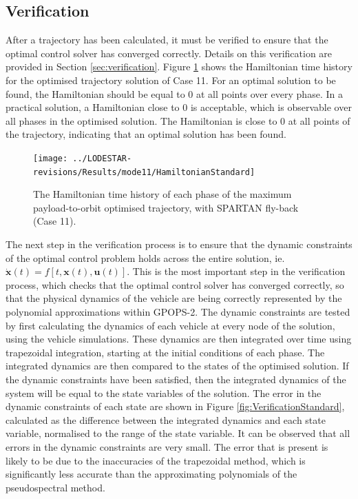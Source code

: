 \subsection{Verification}

After a trajectory has been calculated, it must be verified to ensure that the optimal control solver has converged correctly. Details on this verification are provided in Section \ref{sec:verification}. Figure \ref{fig:HamiltonianStandard} shows the Hamiltonian time history for the optimised trajectory solution of Case 11. For an optimal solution to be found, the Hamiltonian should be equal to 0 at all points over every phase. In a practical solution, a Hamiltonian close to 0 is acceptable, which is observable over all phases in the optimised solution. The Hamiltonian is close to 0 at all points of the trajectory, indicating that an optimal solution has been found. 
\begin{figure}[ht]
	\centering
	\texttt{[image: ../LODESTAR-revisions/Results/mode11/HamiltonianStandard]}
	\caption{The Hamiltonian time history of each phase of the maximum payload-to-orbit optimised trajectory, with SPARTAN fly-back (Case 11).}
	\label{fig:HamiltonianStandard}
\end{figure}

The next step in the verification process is to ensure that the dynamic constraints of the optimal control problem holds across the entire solution, ie. $\dot{\textbf{x}}(t) = f[t,\textbf{x}(t),\textbf{u}(t)]$. This is the most important step in the verification process, which checks that the optimal control solver has converged correctly, so that the physical dynamics of the vehicle are being correctly represented by the polynomial approximations within GPOPS-2. The dynamic constraints are tested by first calculating the dynamics of each vehicle at every node of the solution, using the vehicle simulations. These dynamics are then integrated over time using trapezoidal integration, starting at the initial conditions of each phase. The integrated dynamics are then compared to the states of the optimised solution. If the dynamic constraints have been satisfied, then the integrated dynamics of the system will be equal to the state variables of the solution. The error in the dynamic constraints of each state are shown in Figure \ref{fig:VerificationStandard}, calculated as the difference between the integrated dynamics and each state variable, normalised to the range of the state variable. 
It can be observed that all errors in the dynamic constraints are very small. The error that is present is likely to be due to the inaccuracies of the trapezoidal method, which is significantly less accurate than the approximating polynomials of the pseudospectral method. 



